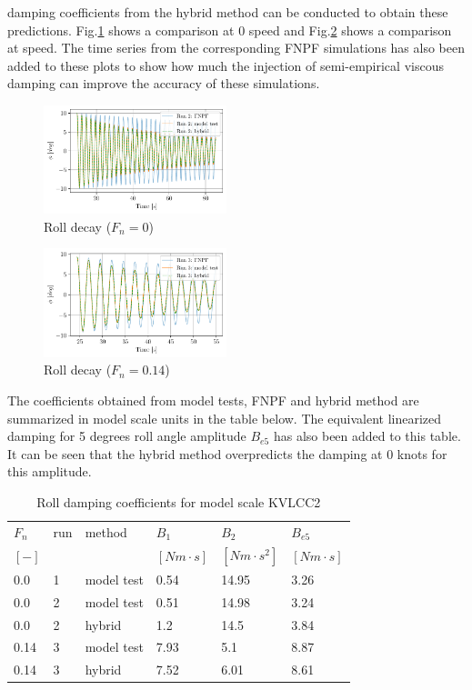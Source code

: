 damping coefficients from the hybrid method can be conducted to obtain
these predictions. Fig.\ref{fig:hybrid_0_time} shows a
comparison at 0 speed and Fig.\ref{fig:hybrid_speed_time} shows
a comparison at speed. The time series from the corresponding FNPF
simulations has also been added to these plots to show how much the
injection of semi-empirical viscous damping can improve the accuracy of
these simulations.
\begin{figure}[H]
\begin{center}\includegraphics[width = 0.475\textwidth]{figures/hybrid_0_time.pdf}\end{center}
\vspace{-0.7cm}
\caption{Roll decay ($F_n=0$)}
\label{fig:hybrid_0_time}
\end{figure}
\begin{figure}[H]
\begin{center}\includegraphics[width = 0.475\textwidth]{figures/hybrid_speed_time.pdf}\end{center}
\vspace{-0.7cm}
\caption{Roll decay ($F_n=0.14$)}
\label{fig:hybrid_speed_time}
\end{figure}
The coefficients obtained from model tests, FNPF and hybrid method are
summarized in model scale units in the table below. The equivalent
linearized damping for 5 degrees roll angle amplitude $B_{e5}$ has
also been added to this table. It can be seen that the hybrid method
overpredicts the damping at 0 knots for this amplitude.
\begin{table}[H]
\scriptsize
\center
\caption{Roll damping coefficients for model scale KVLCC2}
\label{tab:results}
\begin{tabular}{|l|l|l|l|l|l|}
\hline\addlinespace
$F_n$ & run & method & $B_1$ & $B_2$ & $B_{e5}$\\
$[-]$ &  &  & $[Nm \cdot s]$ & $[Nm \cdot s^2]$ & $[Nm \cdot s]$\\
\hline0.0 & 1 & model test & 0.54 & 14.95 & 3.26\\
0.0 & 2 & model test & 0.51 & 14.98 & 3.24\\
0.0 & 2 & hybrid & 1.2 & 14.5 & 3.84\\
0.14 & 3 & model test & 7.93 & 5.1 & 8.87\\
0.14 & 3 & hybrid & 7.52 & 6.01 & 8.61\\
\hline
\end{tabular}
\end{table}

